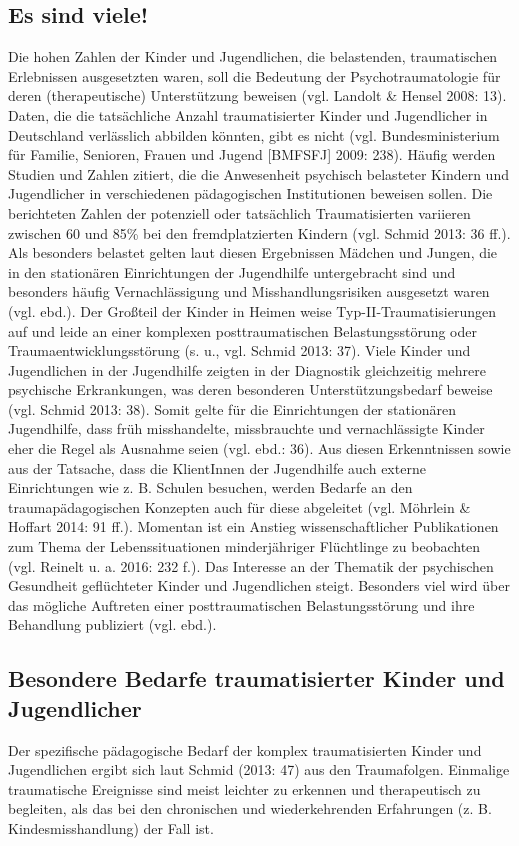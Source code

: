 \subsection{Es sind viele!}
Die hohen Zahlen der Kinder und Jugendlichen, die belastenden, traumatischen Erlebnissen ausgesetzten waren, soll die Bedeutung der Psychotraumatologie für deren (therapeutische) Unterstützung beweisen (vgl. Landolt \& Hensel 2008: 13). Daten, die die tatsächliche Anzahl traumatisierter Kinder und Jugendlicher in Deutschland verlässlich abbilden könnten, gibt es nicht (vgl. Bundesministerium für Familie, Senioren, Frauen und Jugend [BMFSFJ] 2009: 238). Häufig werden Studien und Zahlen zitiert, die die Anwesenheit psychisch belasteter Kindern und Jugendlicher in verschiedenen pädagogischen Institutionen beweisen sollen. Die berichteten Zahlen der potenziell oder tatsächlich Traumatisierten variieren zwischen 60 und 85\% bei den fremdplatzierten Kindern (vgl. Schmid 2013: 36 ff.). Als besonders belastet gelten laut diesen Ergebnissen Mädchen und Jungen, die in den stationären Einrichtungen der Jugendhilfe untergebracht sind und besonders häufig Vernachlässigung und Misshandlungsrisiken ausgesetzt waren (vgl. ebd.). Der Großteil der Kinder in Heimen weise Typ-II-Traumatisierungen auf und leide an einer komplexen posttraumatischen Belastungsstörung oder Traumaentwicklungsstörung (s. u., vgl. Schmid 2013: 37). Viele Kinder und Jugendlichen in der Jugendhilfe zeigten in der Diagnostik gleichzeitig mehrere psychische Erkrankungen, was deren besonderen Unterstützungsbedarf beweise (vgl. Schmid 2013: 38). Somit gelte für die Einrichtungen der station{\"a}ren Jugendhilfe, dass früh misshandelte, missbrauchte und vernachlässigte Kinder eher die Regel als Ausnahme seien (vgl. ebd.: 36). Aus diesen Erkenntnissen sowie aus der Tatsache, dass die KlientInnen der Jugendhilfe auch externe Einrichtungen wie z. B. Schulen besuchen, werden Bedarfe an den traumapädagogischen Konzepten auch für diese abgeleitet (vgl. Möhrlein \& Hoffart 2014: 91 ff.). Momentan ist ein Anstieg wissenschaftlicher Publikationen zum Thema der Lebenssituationen minderj{\"a}hriger Fl{\"u}chtlinge zu beobachten (vgl. Reinelt u. a. 2016: 232 f.). Das Interesse an der Thematik der psychischen Gesundheit gefl{\"u}chteter Kinder und Jugendlichen steigt. Besonders viel wird über das m{\"o}gliche Auftreten einer posttraumatischen Belastungsst{\"o}rung und ihre Behandlung publiziert (vgl. ebd.).

\subsection{Besondere Bedarfe traumatisierter Kinder und Jugendlicher}
Der spezifische pädagogische Bedarf der komplex traumatisierten Kinder und Jugendlichen ergibt sich laut Schmid (2013: 47) aus den Traumafolgen. Einmalige traumatische Ereignisse sind meist leichter zu erkennen und therapeutisch zu begleiten, als das bei den chronischen und wiederkehrenden Erfahrungen (z. B. Kindesmisshandlung) der Fall ist.  

